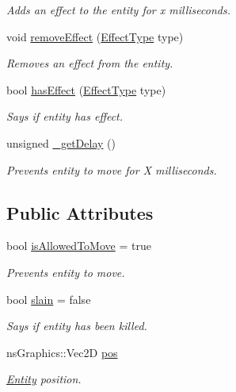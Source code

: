 \begin{DoxyCompactItemize}
\begin{DoxyCompactList}\small\item\em Adds an effect to the entity for x milliseconds. \end{DoxyCompactList}\item 
void \hyperlink{structns_game_1_1_entity_accc47c70658884bd70938642fc1cc431}{remove\+Effect} (\hyperlink{namespacens_game_afea521dd2ba8e97be9549ce9936f4522}{Effect\+Type} type)
\begin{DoxyCompactList}\small\item\em Removes an effect from the entity. \end{DoxyCompactList}\item 
bool \hyperlink{structns_game_1_1_entity_af5bf634702f96ed5daac8130a3dee4f0}{has\+Effect} (\hyperlink{namespacens_game_afea521dd2ba8e97be9549ce9936f4522}{Effect\+Type} type)
\begin{DoxyCompactList}\small\item\em Says if entity has effect. \end{DoxyCompactList}\item 
unsigned \hyperlink{structns_game_1_1_entity_a0c574fba3e12b9bb976d72953626e550}{\+\_\+get\+Delay} ()
\begin{DoxyCompactList}\small\item\em Prevents entity to move for X milliseconds. \end{DoxyCompactList}\end{DoxyCompactItemize}
\subsection*{Public Attributes}
\begin{DoxyCompactItemize}
\item 
bool \hyperlink{structns_game_1_1_entity_a3b26c2bf34732b4621932ab7d50421e9}{is\+Allowed\+To\+Move} = true
\begin{DoxyCompactList}\small\item\em Prevents entity to move. \end{DoxyCompactList}\item 
bool \hyperlink{structns_game_1_1_entity_aaf71fbc10979dcc5b5af55fcb6e44216}{slain} = false
\begin{DoxyCompactList}\small\item\em Says if entity has been killed. \end{DoxyCompactList}\item 
ns\+Graphics\+::\+Vec2D \hyperlink{structns_game_1_1_entity_a1ad359bb31e86c4971fd96b080ed43c4}{pos}
\begin{DoxyCompactList}\small\item\em \hyperlink{structns_game_1_1_entity}{Entity} position. \end{DoxyCompactList}\end{DoxyCompactItemize}
